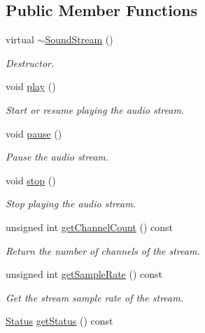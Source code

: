 \subsection*{Public Member Functions}
\begin{DoxyCompactItemize}
\item 
\mbox{\label{classsf_1_1_sound_stream_a1fafb9f1ca572d23d7d6a17921860d85}} 
virtual \hyperlink{classsf_1_1_sound_stream_a1fafb9f1ca572d23d7d6a17921860d85}{$\sim$\+Sound\+Stream} ()
\begin{DoxyCompactList}\small\item\em Destructor. \end{DoxyCompactList}\item 
void \hyperlink{classsf_1_1_sound_stream_afdc08b69cab5f243d9324940a85a1144}{play} ()
\begin{DoxyCompactList}\small\item\em Start or resume playing the audio stream. \end{DoxyCompactList}\item 
void \hyperlink{classsf_1_1_sound_stream_a932ff181e661503cad288b4bb6fe45ca}{pause} ()
\begin{DoxyCompactList}\small\item\em Pause the audio stream. \end{DoxyCompactList}\item 
void \hyperlink{classsf_1_1_sound_stream_a16cc6a0404b32e42c4dce184bb94d0f4}{stop} ()
\begin{DoxyCompactList}\small\item\em Stop playing the audio stream. \end{DoxyCompactList}\item 
unsigned int \hyperlink{classsf_1_1_sound_stream_a1f70933912dd9498f4dc99feefed27f3}{get\+Channel\+Count} () const
\begin{DoxyCompactList}\small\item\em Return the number of channels of the stream. \end{DoxyCompactList}\item 
unsigned int \hyperlink{classsf_1_1_sound_stream_a7da448dc40d81a33b8dc555fbf0d3fbf}{get\+Sample\+Rate} () const
\begin{DoxyCompactList}\small\item\em Get the stream sample rate of the stream. \end{DoxyCompactList}\item 
\hyperlink{classsf_1_1_sound_source_ac43af72c98c077500b239bc75b812f03}{Status} \hyperlink{classsf_1_1_sound_stream_a64a8193ed728da37c115c65de015849f}{get\+Status} () const

\end{DoxyCompactItemize}
